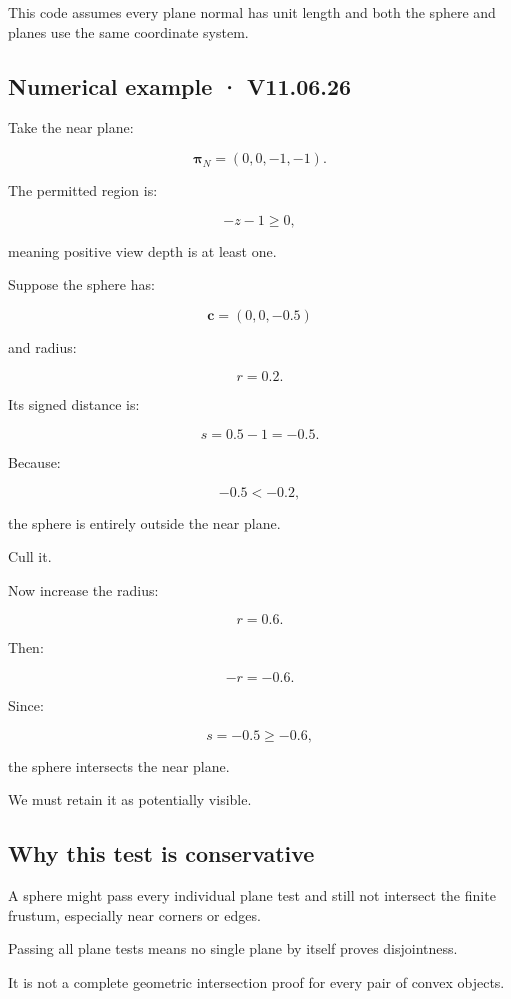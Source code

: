 This code assumes every plane normal has unit length and both the sphere and planes use the same coordinate system.

\subsection{Numerical example · V11.06.26}\label{02-foundations-ii-ch034-numerical-example-v11.06.26}

Take the near plane:

\[
 \boldsymbol\pi_N=(0,0,-1,-1).
\]

The permitted region is:

\[
 -z-1\ge0,
\]

meaning positive view depth is at least one.

Suppose the sphere has:

\[
 \mathbf c=(0,0,-0.5)
\]

and radius:

\[
 r=0.2.
\]

Its signed distance is:

\[
 s=0.5-1=-0.5.
\]

Because:

\[
 -0.5<-0.2,
\]

the sphere is entirely outside the near plane.

Cull it.

Now increase the radius:

\[
 r=0.6.
\]

Then:

\[
 -r=-0.6.
\]

Since:

\[
 s=-0.5\ge-0.6,
\]

the sphere intersects the near plane.

We must retain it as potentially visible.

\subsection{Why this test is conservative}\label{02-foundations-ii-ch034-why-this-test-is-conservative}

A sphere might pass every individual plane test and still not intersect the finite frustum, especially near corners or edges.

Passing all plane tests means no single plane by itself proves disjointness.

It is not a complete geometric intersection proof for every pair of convex objects.

